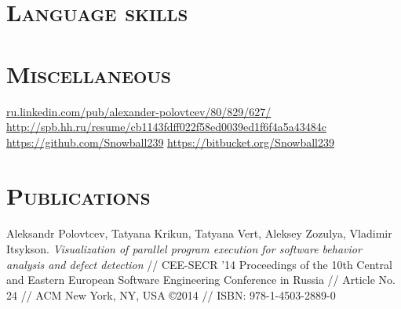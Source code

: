 \documentclass[12pt,a4paper]{moderncv}
\begin{document}
\section{\textsc{Language skills}}
%


\section{\textsc{Miscellaneous}}
%
       {{\color{see}\url{ru.linkedin.com/pub/alexander-polovtcev/80/829/627/}}}
       {{\color{see}\url{http://spb.hh.ru/resume/cb1143fdff022f58ed0039ed1f6f4a5a43484c}}}
       {{\color{see}\url{https://github.com/Snowball239}}}
       {{\color{see}\url{https://bitbucket.org/Snowball239}}}


\section{\textsc{Publications}}
%
    {Aleksandr Polovtcev, Tatyana Krikun, Tatyana Vert, Aleksey Zozulya, Vladimir Itsykson.
    \textit{Visualization of parallel program execution for software behavior analysis and defect detection}
    // CEE-SECR '14 Proceedings of the 10th Central and Eastern European Software Engineering Conference in Russia
    // Article No. 24
    // ACM New York, NY, USA ©2014
    // ISBN: 978-1-4503-2889-0
}
\end{document}
